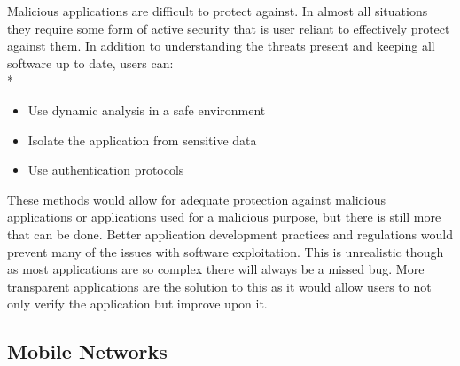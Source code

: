 Malicious applications are difficult to protect against.
In almost all situations they require some form of active security that is user reliant to effectively protect against them.
In addition to understanding the threats present and keeping all software up to date, users can:\\*
\begin{itemize}
\item Use dynamic analysis in a safe environment
\item Isolate the application from sensitive data
\item Use authentication protocols
\end{itemize}
These methods would allow for adequate protection against malicious applications or applications used for a malicious purpose, but there is still more that can be done.
Better application development practices and regulations would prevent many of the issues with software exploitation.
This is unrealistic though as most applications are so complex there will always be a missed bug.
More transparent applications are the solution to this as it would allow users to not only verify the application but improve upon it.\cite{Reference13}


\subsection{Mobile Networks}

\label{Ch2 Sec2 Sub3}

